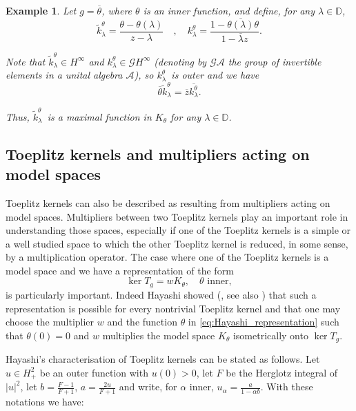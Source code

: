 \documentclass[12pt]{elsarticle}
\numberwithin{equation}{section}
\theoremstyle{plain}
\newtheorem{ex}[thm]{Example}
\newcommand{\Hp}{\ensuremath{H^2_+}}
\newcommand{\Hinf}{\ensuremath{H^\infty}}
\newcommand{\DD}{\ensuremath{\mathbb{D}}}
\renewcommand{\AA}{\ensuremath{\mathcal{A}}}
\newcommand{\GG}{\ensuremath{\mathcal{G}}}
\newcommand{\ol}[1]{\ensuremath{\overline{#1}}}
\newcommand{\kktil}{\ensuremath{\tilde k^\theta_\lambda}}
\newcommand{\kk}{\ensuremath{k^\theta_\lambda}}
\begin{document}
\begin{ex} \label{ex:ktil_is_max_func}
Let $g=\ol \theta$, where $\theta$ is an inner function, and define, for any $\lambda\in\DD$,
\begin{equation}
\label{eq:def_k_k^til}
\kktil = \frac{\theta - \theta(\lambda)}{z-\lambda} \quad , \quad \kk = \frac{1-\ol{\theta(\lambda)}\theta}{1-\ol\lambda z}.
\end{equation}

Note that $\kktil\in\Hinf$ and $\kk \in \GG\Hinf$ (denoting by $\GG\AA$ the group of invertible elements in a unital algebra \AA), so \kk\ is outer and we have
\begin{equation*}
\ol\theta \kktil = \ol z \ol\kk.
\end{equation*}

Thus, \kktil\ is a maximal function in $K_\theta$ for any $\lambda\in\DD$.
\end{ex}



\subsection{Toeplitz kernels and multipliers acting on model spaces}
\label{subsec: Hayashi's representation of Toeplitz kernels}

Toeplitz kernels can also be described as resulting from multipliers acting on model spaces.
Multipliers between two Toeplitz kernels play an important role in understanding those spaces, especially if one of the Toeplitz kernels is a simple or a well studied space to which the other Toeplitz kernel is reduced, in some sense, by a multiplication operator.
The case where one of the Toeplitz kernels is a model space and we have a representation of the form
\begin{equation}
\label{eq:Hayashi_representation}
\ker T_g = w K_\theta , \quad \theta \text{ inner},
\end{equation}
is particularly important.
Indeed Hayashi showed (\cite[Thm. 3]{Ha86}, see also \cite{Sa94}) that such a representation is possible for every nontrivial Toeplitz kernel and that one may choose the multiplier $w$ and the function $\theta$ in \eqref{eq:Hayashi_representation} such that $\theta (0) = 0$ and $w$ multiplies the model space $K_\theta$ isometrically onto $\ker T_g$.


Hayashi's characterisation of Toeplitz kernels can be stated as follows.
Let $u\in\Hp$ be an outer function with $u(0)>0$, let $F$ be the Herglotz integral of $|u|^2$, let $b= \frac{F-1}{F+1}$, $a= \frac{2u}{F+1}$
and write, for $\alpha$ inner, $u_\alpha = \frac{a}{1-\alpha b}$.
With these notations we have:
\end{document}
